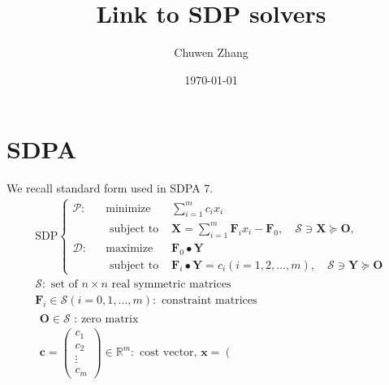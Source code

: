 \documentclass[../main]{subfiles}
\title{Link to SDP solvers}
\author{Chuwen Zhang}
\date{\today}
\begin{document}
\maketitle
{
    \setcounter{tocdepth}{3}
    \tableofcontents
}

\section{SDPA}


We recall standard form used in SDPA 7.
\[
    \begin{array}{l}
        \mathrm{SDP}\left\{\begin{aligned}
            \mathcal{P}: &  & \operatorname{minimize} & \sum_{i=1}^{m} c_{i} x_{i}                                                                      \\
                         &  & \text { subject to }    & \bm{X}=\sum_{i=1}^{m} \bm{F}_{i} x_{i}-\bm{F}_{0}, \quad \mathcal{S} \ni \bm{X} \succeq \bm{O}, \\
            \mathcal{D}: &  & \operatorname{maximize} & \bm{F}_{0} \bullet \bm{Y}                                                                       \\
                         &  & \text { subject to }    & \bm{F}_{i} \bullet \bm{Y}=c_{i}(i=1,2, \ldots, m), \quad \mathcal{S} \ni \bm{Y} \succeq \bm{O}
        \end{aligned}\right.                                                                                                        \\
        \mathcal{S}: \text { set of } n \times n \text { real symmetric matrices }                                                                                 \\
        \bm{F}_{i} \in \mathcal{S}(i=0,1, \ldots, m): \text { constraint matrices }                                                                                \\
        \begin{array}{l}
            \bm{O} \in \mathcal{S} \text { : zero matrix } \\
            \bm{c}=\left(\begin{array}{c}
                    c_{1}  \\
                    c_{2}  \\
                    \vdots \\
                    c_{m}
                \end{array}\right) \in \mathbb{R}^{m}: \text { cost vector, } \bm{x}=\left(\begin{array}{c}

\end{array}
\end{array}
\end{array}\]
\end{document}
